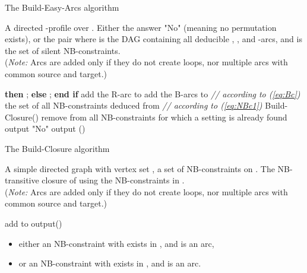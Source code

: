 \documentclass{article}
\begin{document}
\begin{algorithm}[t,boxed]
\caption{The Build-Easy-Arcs algorithm}
\begin{algorithmic}[1]
{\small \REQUIRE A directed -profile  over .
\ENSURE  Either the answer "No" (meaning no permutation exists), or the pair 
 where  is the DAG containing all deducible , ,  and -arcs, and
 is the set of silent NB-constraints. \\
\hspace*{-0.6cm}({\sl  Note:} Arcs are added only if they do not create loops, nor multiple arcs with common source and target.)

\medskip

\STATE 
{}
  {\bf then} ;  {\bf else}   ;  {\bf end if}
\STATE add the R-arc  to 
\STATE add the B-arcs  to  {\sl \hfill // according to (\ref{eq:Bc})}
\ENDFOR
\STATE  the set of all NB-constraints  deduced from   {\sl \hfill // according to (\ref{eq:NBc1})}
\STATE  Build-Closure()
\STATE remove from  all NB-constraints  for which a setting is already found
\STATE output "No"
\ELSE
\STATE output ()
\ENDIF}
\end{algorithmic}
\label{algo:Arcs}
\end{algorithm}

\begin{algorithm}[t,boxed]
\caption{The Build-Closure algorithm}
\begin{algorithmic}[1]
{\small \REQUIRE A simple directed graph  with vertex set , a set  of NB-constraints on .
\ENSURE  The NB-transitive closure of  using the NB-constraints in . \\
\hspace*{-0.6cm}({\sl  Note:} Arcs are added only if they do not create loops, nor multiple arcs with common source and target.)

\medskip

\STATE add  to  
\ENDWHILE
\STATE output()}
\end{algorithmic}
\label{algo:Closure}
\end{algorithm}





\begin{itemize}

\item[] either an NB-constraint  with  exists in ,  and  is an arc,

\item[] or an NB-constraint   with   exists in ,  and  is an arc.
\end{itemize}
\end{document}

